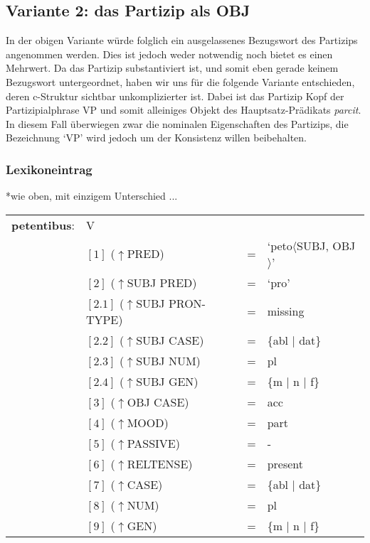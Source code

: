 \documentclass[12pt,a4paper]{article}
\begin{document}
\subsection{Variante 2: das Partizip als OBJ}
In der obigen Variante würde folglich ein ausgelassenes Bezugswort des Partizips angenommen werden. Dies ist jedoch weder notwendig noch bietet es einen Mehrwert. Da das Partizip substantiviert ist, und somit eben gerade keinem Bezugswort untergeordnet, haben wir uns für die folgende Variante entschieden, deren c-Struktur sichtbar unkomplizierter ist. Dabei ist das Partizip Kopf der Partizipialphrase VP und somit alleiniges Objekt des Hauptsatz-Prädikats \textit{parcit}. In diesem Fall überwiegen zwar die nominalen Eigenschaften des Partizips, die Bezeichnung `VP' wird jedoch um der Konsistenz willen beibehalten.


\subsubsection{Lexikoneintrag}
*wie oben, mit einzigem Unterschied ...

\begin{singlespace}
\begin{tabular}{ l  l  l  l  } 
\textbf{petentibus}: & V \\
$\qquad$ & $[1]$ \:  ($\uparrow$PRED) & = & `peto$\langle$SUBJ, OBJ$\rangle$' \\
$\qquad$ & $[2]$ \:  ($\uparrow$SUBJ PRED) & = & `pro' \\
$\qquad$ & $[2.1]$ \:  ($\uparrow$SUBJ PRON-TYPE) & = & missing \\
$\qquad$ & $[2.2]$ \:  ($\uparrow$SUBJ CASE) & = & \{abl $\mid$ dat\} \\
$\qquad$ & $[2.3]$ \:  ($\uparrow$SUBJ NUM) & = & pl \\
$\qquad$ & $[2.4]$ \:  ($\uparrow$SUBJ GEN) & = & \{m $\mid$ n $\mid$ f\} \\
$\qquad$ & $[3]$ \:  ($\uparrow$OBJ CASE) & = & acc \\
$\qquad$ & $[4]$ \:  ($\uparrow$MOOD) & = & part\\
$\qquad$ & $[5]$ \:  ($\uparrow$PASSIVE) & = & - \\
$\qquad$ & $[6]$ \:  ($\uparrow$RELTENSE) & = & present \\ 
$\qquad$ & $[7]$ \:  ($\uparrow$CASE) & = & \{abl $\mid$ dat\} \\
$\qquad$ & $[8]$ \:  ($\uparrow$NUM) & = & pl \\
$\qquad$ & $[9]$ \:  ($\uparrow$GEN) & = & \{m $\mid$ n $\mid$ f\} \\
\end{tabular}
\newline
\newline
\end{singlespace}
\end{document}
